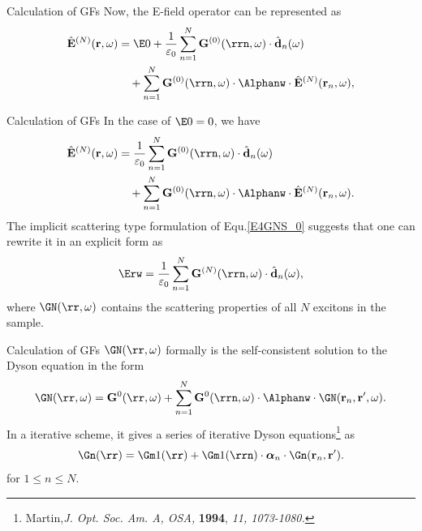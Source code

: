 \documentclass{beamer}
\begin{document}
\begin{frame}{Calculation of GFs}
Now, the E-field operator can be represented as
\begin{align}
 \hat{\mathbf{E}}^{(N)}(\mathbf{r},\omega) &=\E0+\frac{1}{\varepsilon_0}\sum_{n=1}^N{\mathbf{G}^{(0)}(\rrn,\omega)\cdot \hat{\mathbf{d}}_n(\omega)} \nonumber \\
 &\quad +\sum_{n=1}^N{\mathbf{G}^{(0)}(\rrn,\omega)\cdot \Alphanw \cdot \hat{\mathbf{E}}^{(N)}(\mathbf{r}_n,\omega)},  \label{E4GNS}
\end{align}

\end{frame}

\begin{frame}{Calculation of GFs}
\fontsize{9}{-0.2}\selectfont
In the case of  $\E0=0$, we have
\begin{align}
 \label{E4GNS_0}
 \hat{\mathbf{E}}^{(N)}(\mathbf{r},\omega) &=\frac{1}{\varepsilon_0}\sum_{n=1}^N{\mathbf{G}^{(0)}(\rrn,\omega)\cdot \hat{\mathbf{d}}_n(\omega)} \nonumber \\
 &\quad +\sum_{n=1}^N{\mathbf{G}^{(0)}(\rrn,\omega)\cdot \Alphanw \cdot \hat{\mathbf{E}}^{(N)}(\mathbf{r}_n,\omega)}.
\end{align}
The implicit scattering type formulation of Equ.\eqref{E4GNS_0} suggests that one can rewrite it in an explicit form as
\begin{equation}
 \label{E4GNS_1}
\Erw =\frac{1}{\varepsilon_0}\sum_{n=1}^N{\mathbf{G}^{(N)}(\rrn,\omega)\cdot \hat{\mathbf{d}}_n(\omega)},
\end{equation}
where $\GN(\rr,\omega)$ contains the scattering properties
of all $N$ excitons in the sample. 
\end{frame}

\begin{frame}{Calculation of GFs}
\fontsize{9}{-0.2}\selectfont
$\GN(\rr,\omega)$ formally is the self-consistent solution to the Dyson equation in the form
\begin{equation}
 \label{dysonGN}
\GN(\rr,\omega)=\mathbf{G}^0(\rr,\omega)+\sum_{n=1}^N{\mathbf{G}^0(\rrn,\omega)\cdot \Alphanw \cdot \GN(\mathbf{r}_n,\mathbf{r}',\omega)}.
\end{equation}
In a iterative scheme, it gives a series of iterative Dyson equations{\footnote{Martin,\textit{J. Opt. Soc. Am. A, OSA,} \textbf{1994}, \textit{11, 1073-1080.}}} as
\begin{equation}
 \label{dysonGn}
\Gn(\rr)=\Gm1(\rr)+{\Gm1(\rrn)\cdot {\bm \alpha}_n \cdot \Gn(\mathbf{r}_n,\mathbf{r}')}.
\end{equation}
for $1 \leq  n \leq  N$.
\end{frame}
\end{document}
